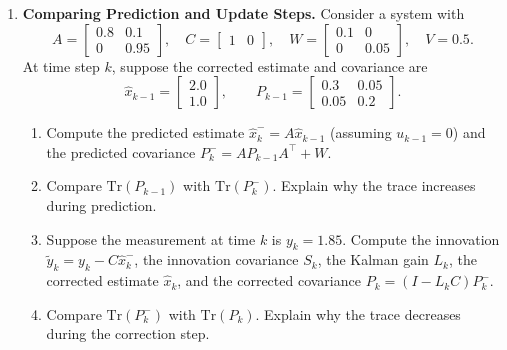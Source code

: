 \begin{enumerate}
\item \textbf{Comparing Prediction and Update Steps.}
Consider a system with
\[
A = \begin{bmatrix} 0.8 & 0.1 \\ 0 & 0.95 \end{bmatrix}, \quad
C = \begin{bmatrix} 1 & 0 \end{bmatrix}, \quad
W = \begin{bmatrix} 0.1 & 0 \\ 0 & 0.05 \end{bmatrix}, \quad
V = 0.5.
\]
At time step $k$, suppose the corrected estimate and covariance are
\[
\hat{x}_{k-1} = \begin{bmatrix} 2.0 \\ 1.0 \end{bmatrix}, \qquad
P_{k-1} = \begin{bmatrix} 0.3 & 0.05 \\ 0.05 & 0.2 \end{bmatrix}.
\]
\begin{enumerate}
	\item Compute the predicted estimate $\hat{x}_k^- = A\hat{x}_{k-1}$ (assuming $u_{k-1} = 0$) and the predicted covariance $P_k^- = A P_{k-1} A^\top + W$.
	\item Compare $\mathrm{Tr}(P_{k-1})$ with $\mathrm{Tr}(P_k^-)$. Explain why the trace increases during prediction.
	\item Suppose the measurement at time $k$ is $y_k = 1.85$. Compute the innovation $\tilde{y}_k = y_k - C\hat{x}_k^-$, the innovation covariance $S_k$, the Kalman gain $L_k$, the corrected estimate $\hat{x}_k$, and the corrected covariance $P_k = (I - L_k C) P_k^-$.
	\item Compare $\mathrm{Tr}(P_k^-)$ with $\mathrm{Tr}(P_k)$. Explain why the trace decreases during the correction step.
\end{enumerate}


\end{enumerate}

